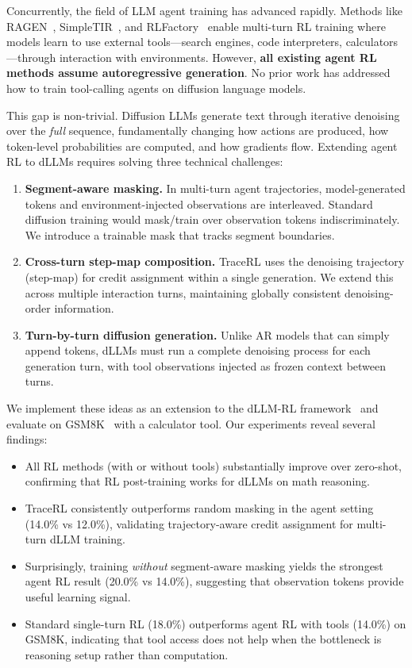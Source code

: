 \documentclass{article}
\begin{document}
Concurrently, the field of LLM agent training has advanced rapidly. Methods like RAGEN~\citep{wang2025ragen}, SimpleTIR~\citep{xue2025simpletir}, and RLFactory~\citep{chai2025rlfactory} enable multi-turn RL training where models learn to use external tools---search engines, code interpreters, calculators---through interaction with environments. However, \textbf{all existing agent RL methods assume autoregressive generation}. No prior work has addressed how to train tool-calling agents on diffusion language models.

This gap is non-trivial. Diffusion LLMs generate text through iterative denoising over the \emph{full} sequence, fundamentally changing how actions are produced, how token-level probabilities are computed, and how gradients flow. Extending agent RL to dLLMs requires solving three technical challenges:

\begin{enumerate}[leftmargin=*,itemsep=2pt]
    \item \textbf{Segment-aware masking.} In multi-turn agent trajectories, model-generated tokens and environment-injected observations are interleaved. Standard diffusion training would mask/train over observation tokens indiscriminately. We introduce a trainable mask that tracks segment boundaries.

    \item \textbf{Cross-turn step-map composition.} TraceRL uses the denoising trajectory (step-map) for credit assignment within a single generation. We extend this across multiple interaction turns, maintaining globally consistent denoising-order information.

    \item \textbf{Turn-by-turn diffusion generation.} Unlike AR models that can simply append tokens, dLLMs must run a complete denoising process for each generation turn, with tool observations injected as frozen context between turns.
\end{enumerate}

We implement these ideas as an extension to the dLLM-RL framework~\citep{tracerl2025} and evaluate on GSM8K~\citep{cobbe2021gsm8k} with a calculator tool. Our experiments reveal several findings:
\begin{itemize}[leftmargin=*,itemsep=2pt]
    \item All RL methods (with or without tools) substantially improve over zero-shot, confirming that RL post-training works for dLLMs on math reasoning.
    \item TraceRL consistently outperforms random masking in the agent setting (14.0\% vs 12.0\%), validating trajectory-aware credit assignment for multi-turn dLLM training.
    \item Surprisingly, training \emph{without} segment-aware masking yields the strongest agent RL result (20.0\% vs 14.0\%), suggesting that observation tokens provide useful learning signal.
    \item Standard single-turn RL (18.0\%) outperforms agent RL with tools (14.0\%) on GSM8K, indicating that tool access does not help when the bottleneck is reasoning setup rather than computation.
\end{itemize}
\end{document}

